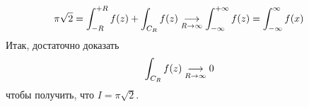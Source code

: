 \begin{align*}
  & \pi \sqrt{2} = \int_{-R}^{+R}f(z) + \int_{C_R}f(z) \underset{R\to \infty}{\longrightarrow} \int_{-\infty}^{+\infty} f(z) = \int_{-\infty}^{\infty}f(x)
\end{align*}
Итак, достаточно доказать
\begin{align*}
  & \int_{C_R}f(z)  \underset{R\to \infty}{\longrightarrow} 0
\end{align*}
чтобы получить, что $I = \pi \sqrt{2}$.